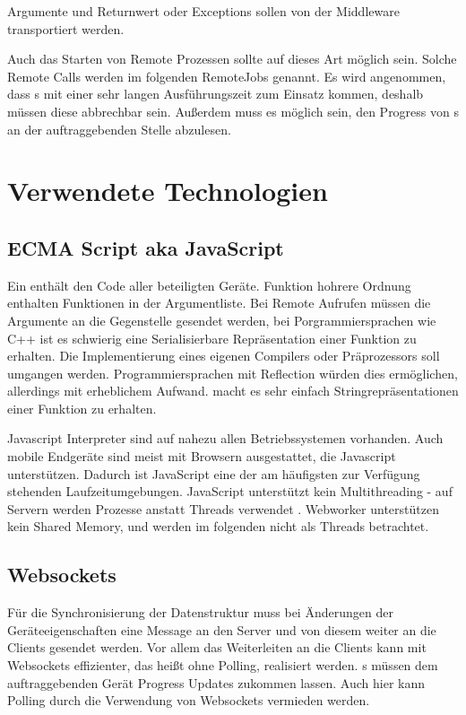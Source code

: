   \item Argumente und Returnwert oder Exceptions sollen von der Middleware transportiert werden.

  \item Auch das Starten von Remote Prozessen sollte auf dieses Art möglich sein.
  Solche Remote Calls werden im folgenden RemoteJobs genannt.
  Es wird angenommen, dass \remoteJob s mit einer sehr langen Ausführungszeit zum Einsatz kommen, deshalb müssen diese abbrechbar sein.
  Außerdem muss es möglich sein, den Progress von \remoteJob s an der auftraggebenden Stelle abzulesen.
\ECL





\clearpage
\section{Verwendete Technologien}

\subsection{ECMA Script aka JavaScript}
Ein \jobScript{} enthält den Code aller beteiligten Geräte.
Funktion hohrere Ordnung enthalten Funktionen in der Argumentliste.
Bei Remote Aufrufen müssen die Argumente an die Gegenstelle gesendet werden, bei Porgrammiersprachen wie C++ ist es schwierig eine Serialisierbare Repräsentation einer Funktion zu erhalten.
Die Implementierung eines eigenen Compilers oder Präprozessors soll umgangen werden.
Programmiersprachen mit Reflection würden dies ermöglichen, allerdings mit erheblichem Aufwand.
\JavaScript{} macht es sehr einfach Stringrepräsentationen einer Funktion zu erhalten.

Javascript Interpreter sind auf nahezu allen Betriebssystemen vorhanden.
Auch mobile Endgeräte sind meist mit Browsern ausgestattet, die Javascript unterstützen.
Dadurch ist JavaScript eine der am häufigsten zur Verfügung stehenden Laufzeitumgebungen.
JavaScript unterstützt kein Multithreading - auf Servern werden Prozesse anstatt Threads verwendet \cite{nodecite}.
Webworker unterstützen kein Shared Memory, und werden im folgenden nicht als Threads betrachtet.




\subsection{Websockets}
Für die Synchronisierung der \netInfo{} Datenstruktur muss bei Änderungen der Geräteeigenschaften eine Message an den Server und von diesem weiter an die Clients gesendet werden.
Vor allem das Weiterleiten an die Clients kann mit Websockets effizienter, das heißt ohne Polling, realisiert werden.
\remoteJob s müssen dem auftraggebenden Gerät Progress Updates zukommen lassen.
Auch hier kann Polling durch die Verwendung von Websockets vermieden werden.




